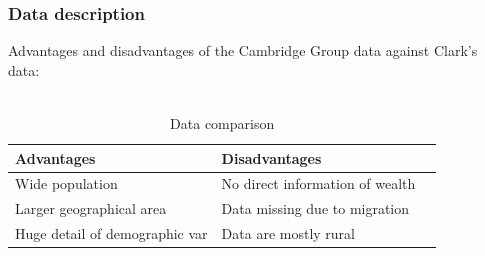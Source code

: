 \documentclass[pdftex,12pt,xcolor=pdftex,table]{beamer}
\begin{document}

\begin{frame}
\frametitle{Data description}
Advantages and disadvantages of the Cambridge Group data against Clark's data:\\~\\

\begin{table}
\begin{tabular}{l l l}
\toprule
\textbf{Advantages} & \textbf{Disadvantages}\\
\midrule
Wide population & No direct information of wealth \\
Larger geographical area & Data missing due to
migration\\
Huge detail of demographic var & Data are mostly
rural \\
\bottomrule
\end{tabular}
\caption{Data comparison}
\end{table}
\end{frame}
\end{document}
